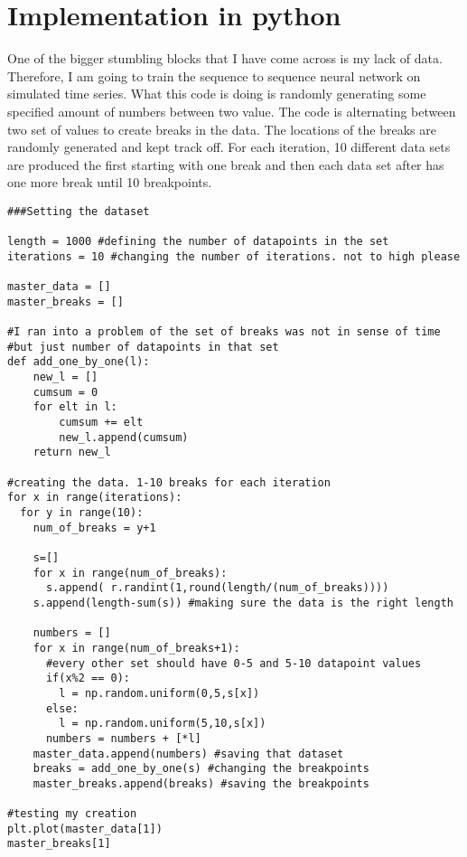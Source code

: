 \documentclass[12pt]{article}
\begin{document}
\section{Implementation in python}
One of the bigger stumbling blocks that I have come across is my lack of data. Therefore, I am going to train the sequence to sequence neural network on simulated time series. What this code is doing is randomly generating some specified amount of numbers between two value. The code is alternating between two set of values to create breaks in the data. The locations of the breaks are randomly generated and kept track off. For each iteration, 10 different data sets are produced the first starting with one break and then each data set after has one more break until 10 breakpoints.
\lstset{language=Python,breaklines=true,basicstyle=\small\ttfamily}
\begin{lstlisting}[frame=single]
###Setting the dataset 

length = 1000 #defining the number of datapoints in the set
iterations = 10 #changing the number of iterations. not to high please 

master_data = []
master_breaks = []

#I ran into a problem of the set of breaks was not in sense of time 
#but just number of datapoints in that set 
def add_one_by_one(l):
    new_l = []
    cumsum = 0
    for elt in l:
        cumsum += elt
        new_l.append(cumsum)
    return new_l

#creating the data. 1-10 breaks for each iteration 
for x in range(iterations):
  for y in range(10):
    num_of_breaks = y+1
  
    s=[]
    for x in range(num_of_breaks):
      s.append( r.randint(1,round(length/(num_of_breaks))))
    s.append(length-sum(s)) #making sure the data is the right length

    numbers = []
    for x in range(num_of_breaks+1):
      #every other set should have 0-5 and 5-10 datapoint values
      if(x%2 == 0):
        l = np.random.uniform(0,5,s[x]) 
      else:
        l = np.random.uniform(5,10,s[x]) 
      numbers = numbers + [*l]
    master_data.append(numbers) #saving that dataset
    breaks = add_one_by_one(s) #changing the breakpoints
    master_breaks.append(breaks) #saving the breakpoints 

#testing my creation     
plt.plot(master_data[1])
master_breaks[1]


\end{lstlisting}

\end{document}

